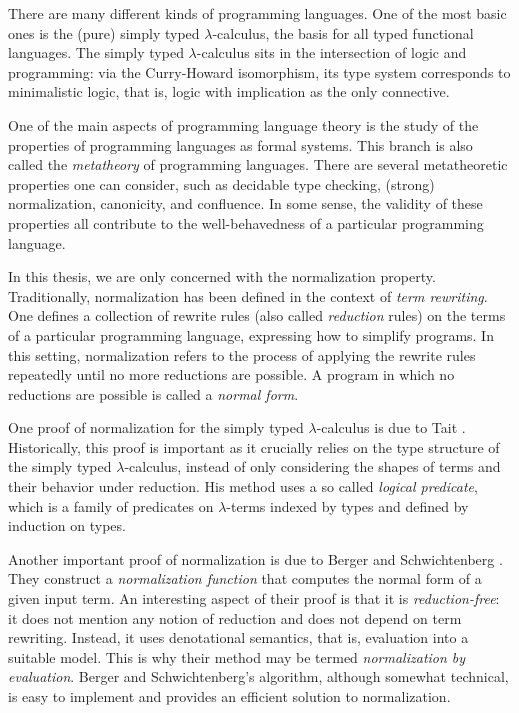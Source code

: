 There are many different kinds of programming languages. One of the most basic ones is the (pure) simply typed $\lambda$-calculus, the basis for all typed functional languages. The simply typed $\lambda$-calculus sits in the intersection of logic and programming: via the Curry-Howard isomorphism, its type system corresponds to minimalistic logic, that is, logic with implication as the only connective.

One of the main aspects of programming language theory is the study of the properties of programming languages as formal systems. This branch is also called the \textit{metatheory} of programming languages. There are several metatheoretic properties one can consider, such as decidable type checking, (strong) normalization, canonicity, and confluence. In some sense, the validity of these properties all contribute to the well-behavedness of a particular programming language.

In this thesis, we are only concerned with the normalization property. Traditionally, normalization has been defined in the context of \textit{term rewriting}. One defines a collection of rewrite rules (also called \textit{reduction} rules) on the terms of a particular programming language, expressing how to simplify programs. In this setting, normalization refers to the process of applying the rewrite rules repeatedly until no more reductions are possible. A program in which no reductions are possible is called a \textit{normal form}.

One proof of normalization for the simply typed $\lambda$-calculus is due to Tait \cite{tait:1967:jsl}. Historically, this proof is important as it crucially relies on the type structure of the simply typed $\lambda$-calculus, instead of only considering the shapes of terms and their behavior under reduction. His method uses a so called \textit{logical predicate}, which is a family of predicates on $\lambda$-terms indexed by types and defined by induction on types.

Another important proof of normalization is due to Berger and Schwichtenberg \cite{DBLP:conf/lics/BergerS91}. They construct a \textit{normalization function} that computes the normal form of a given input term. An interesting aspect of their proof is that it is \textit{reduction-free}: it does not mention any notion of reduction and does not depend on term rewriting. Instead, it uses denotational semantics, that is, evaluation into a suitable model. This is why their method may be termed \textit{normalization by evaluation}. Berger and Schwichtenberg's algorithm, although somewhat technical, is easy to implement and provides an efficient solution to normalization.

